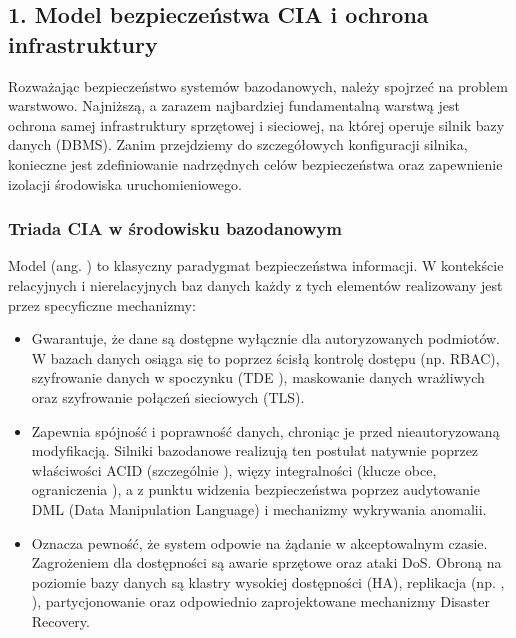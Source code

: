 \documentclass[letterpaper,10pt,english]{sphinxmanual}
\begin{document}
\sphinxstepscope


\subsection{1. Model bezpieczeństwa CIA i ochrona infrastruktury}
\label{\detokenize{rozdzial_2/rozdzial_27/rozdzial_1:model-bezpieczenstwa-cia-i-ochrona-infrastruktury}}\label{\detokenize{rozdzial_2/rozdzial_27/rozdzial_1::doc}}
\sphinxAtStartPar
Rozważając bezpieczeństwo systemów bazodanowych, należy spojrzeć na problem warstwowo. Najniższą, a zarazem najbardziej fundamentalną warstwą jest ochrona samej infrastruktury sprzętowej i sieciowej, na której operuje silnik bazy danych (DBMS). Zanim przejdziemy do szczegółowych konfiguracji silnika, konieczne jest zdefiniowanie nadrzędnych celów bezpieczeństwa oraz zapewnienie izolacji środowiska uruchomieniowego.


\subsubsection{Triada CIA w środowisku bazodanowym}
\label{\detokenize{rozdzial_2/rozdzial_27/rozdzial_1:triada-cia-w-srodowisku-bazodanowym}}
\sphinxAtStartPar
Model  (ang. ) to klasyczny paradygmat bezpieczeństwa informacji. W kontekście relacyjnych i nierelacyjnych baz danych każdy z tych elementów realizowany jest przez specyficzne mechanizmy:
\begin{itemize}
\item {} 
\sphinxAtStartPar
{} Gwarantuje, że dane są dostępne wyłącznie dla autoryzowanych podmiotów. W bazach danych osiąga się to poprzez ścisłą kontrolę dostępu (np. RBAC), szyfrowanie danych w spoczynku (TDE \sphinxhyphen{} ), maskowanie danych wrażliwych oraz szyfrowanie połączeń sieciowych (TLS).

\item {} 
\sphinxAtStartPar
{} Zapewnia spójność i poprawność danych, chroniąc je przed nieautoryzowaną modyfikacją. Silniki bazodanowe realizują ten postulat natywnie poprzez właściwości ACID (szczególnie ), więzy integralności (klucze obce, ograniczenia ), a z punktu widzenia bezpieczeństwa \textendash{} poprzez audytowanie DML (Data Manipulation Language) i mechanizmy wykrywania anomalii.

\item {} 
\sphinxAtStartPar
{} Oznacza pewność, że system odpowie na żądanie w akceptowalnym czasie. Zagrożeniem dla dostępności są awarie sprzętowe oraz ataki DoS. Obroną na poziomie bazy danych są klastry wysokiej dostępności (HA), replikacja (np. , ), partycjonowanie oraz odpowiednio zaprojektowane mechanizmy Disaster Recovery.

\end{itemize}
\end{document}

